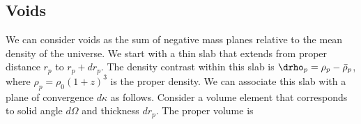 \subsection{Voids}
We can consider voids as the sum of negative mass planes relative to the mean density of the universe. We start with a thin slab that extends from proper distance $r_p$ to $r_p+dr_p$.  The density contrast within this slab is $\drho_p = \rho_p - \bar\rho_p$, where $\rho_p = \rho_0 (1+z)^3$ is the proper density.  We can associate this slab with a plane of convergence $d\kappa$ as follows.  Consider a volume element that corresponds to solid angle $d\Omega$ and thickness $dr_p$.  The proper volume is